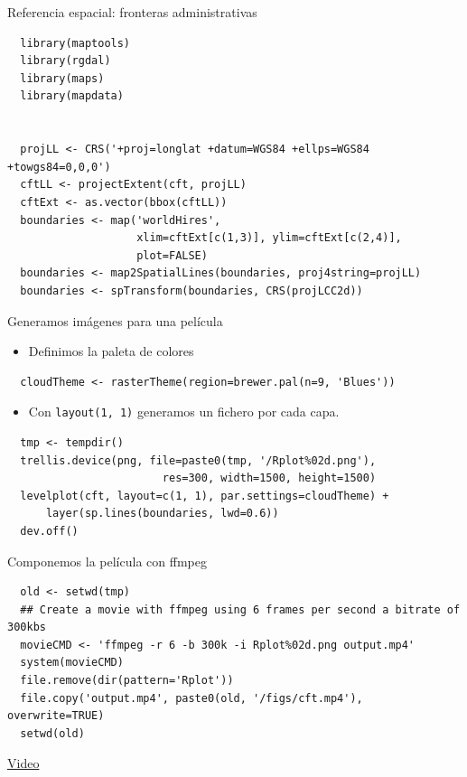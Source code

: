 \documentclass[xcolor={usenames,svgnames,dvipsnames}]{beamer}
\begin{document}
\begin{frame}[fragile,label=sec-4-5-2]{Referencia espacial: fronteras administrativas}
 \lstset{language=R,label= ,caption= ,numbers=none}
\begin{lstlisting}
  library(maptools)
  library(rgdal)
  library(maps)
  library(mapdata)
  
  
  projLL <- CRS('+proj=longlat +datum=WGS84 +ellps=WGS84 +towgs84=0,0,0')
  cftLL <- projectExtent(cft, projLL)
  cftExt <- as.vector(bbox(cftLL))
  boundaries <- map('worldHires',
                    xlim=cftExt[c(1,3)], ylim=cftExt[c(2,4)],
                    plot=FALSE)
  boundaries <- map2SpatialLines(boundaries, proj4string=projLL)
  boundaries <- spTransform(boundaries, CRS(projLCC2d))
\end{lstlisting}
\end{frame}


\begin{frame}[fragile,label=sec-4-5-3]{Generamos imágenes para una película}
 \begin{itemize}
\item Definimos la paleta de colores
\end{itemize}
\lstset{language=R,label= ,caption= ,numbers=none}
\begin{lstlisting}
  cloudTheme <- rasterTheme(region=brewer.pal(n=9, 'Blues'))
\end{lstlisting}

\begin{itemize}
\item Con \texttt{layout(1, 1)} generamos un fichero por cada capa.
\end{itemize}
\lstset{language=R,label= ,caption= ,numbers=none}
\begin{lstlisting}
  tmp <- tempdir()
  trellis.device(png, file=paste0(tmp, '/Rplot%02d.png'),
                        res=300, width=1500, height=1500)
  levelplot(cft, layout=c(1, 1), par.settings=cloudTheme) +
      layer(sp.lines(boundaries, lwd=0.6))
  dev.off()
\end{lstlisting}
\end{frame}

\begin{frame}[fragile,label=sec-4-5-4]{Componemos la película con ffmpeg}
 \lstset{language=R,label= ,caption= ,numbers=none}
\begin{lstlisting}
  old <- setwd(tmp)
  ## Create a movie with ffmpeg using 6 frames per second a bitrate of 300kbs
  movieCMD <- 'ffmpeg -r 6 -b 300k -i Rplot%02d.png output.mp4'
  system(movieCMD)
  file.remove(dir(pattern='Rplot'))
  file.copy('output.mp4', paste0(old, '/figs/cft.mp4'), overwrite=TRUE)
  setwd(old)
\end{lstlisting}

\begin{block}{}
\href{http://vimeo.com/user18057623/cft}{Video}
\end{block}
\end{frame}
\end{document}
